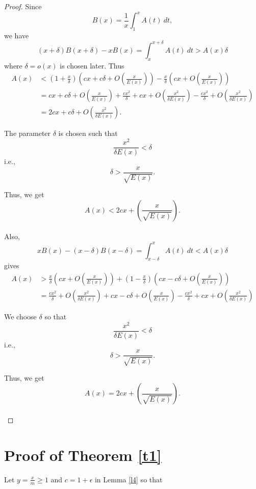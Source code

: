\documentclass[sn-mathphys,Numbered]{sn-jnl}
\theoremstyle{thmstyleone}%
\theoremstyle{thmstyletwo}%
\theoremstyle{thmstylethree}%
\begin{document}
\begin{proof}
Since
$$ B(x) = \frac{1}{x} \int_1^x A(t) \ dt ,$$
we have
$$ (x+\delta)B(x+\delta) -xB(x) = \int_x^{x+\delta} A(t) \ dt >A(x) \delta $$
where $\delta=o(x)$ is chosen later. 
Thus
\begin{align*}
A(x) &< \left( 1+\frac{x}{\delta} \right) \left( cx +c\delta + O \left( \frac{x}{E(x)} \right) \right) -\frac{x}{\delta} \left( cx + O \left( \frac{x}{E(x)} \right) \right)\\
&= cx + c\delta + O \left( \frac{x}{E(x)} \right) + \frac{cx^2}{\delta} +cx + O \left( \frac{x^2}{\delta E(x)} \right) -\frac{cx^2}{\delta} + O \left( \frac{x^2}{\delta E(x)} \right) \\
&= 2cx + c\delta + O \left( \frac{x^2}{\delta E(x)} \right).
\end{align*}

The parameter $\delta$ is chosen such that 
$$ \frac{x^2}{\delta E(x)} < \delta $$
i.e.,
$$ \delta > \frac{x}{\sqrt{E(x)}}. $$

Thus, we get
$$ A(x) < 2cx + \left( \frac{x}{\sqrt{E(x)}} \right). $$ \\

Also,
$$ xB(x) - (x-\delta)B(x-\delta) = \int_{x-\delta}^x A(t) \ dt < A(x) \delta $$
gives
\begin{align*}
A(x) &> \frac{x}{\delta} \left( cx + O \left( \frac{x}{E(x)} \right) \right) + \left( 1- \frac{x}{\delta} \right) \left( cx -c\delta + O \left( \frac{x}{E(x)} \right) \right)  \\
&= \frac{cx^2}{\delta} + O \left( \frac{x^2}{\delta E(x)} \right) +cx -c\delta + O \left( \frac{x}{E(x)} \right) -\frac{cx^2}{\delta} +cx + O \left( \frac{x^2}{\delta E(x)} \right) 
\end{align*}

We choose $\delta$ so that 
$$ \frac{x^2}{\delta E(x)} < \delta $$
i.e.,
$$ \delta > \frac{x}{\sqrt{E(x)}}. $$

Thus, we get
$$ A(x) = 2cx + \left( \frac{x}{\sqrt{E(x)}} \right). $$ \\

\end{proof}








\section{Proof of Theorem \ref{t1}}
\noindent
Let $y =\frac{x}{m} \geq 1$ and $c=1+\epsilon$ in Lemma \ref{l4} so that
\end{document}
